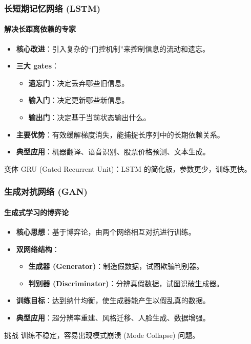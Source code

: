 \documentclass[12pt, t, aspectratio=169]{beamer}
\begin{document}
\begin{frame}
    \frametitle{长短期记忆网络 (LSTM)}
    \framesubtitle{解决长距离依赖的专家}
    
    \begin{itemize}
        \item \textbf{核心改进}：引入复杂的“门控机制”来控制信息的流动和遗忘。
        \item \textbf{三大 gates}：
        \begin{itemize}
            \item \textbf{遗忘门}：决定丢弃哪些旧信息。
            \item \textbf{输入门}：决定更新哪些新信息。
            \item \textbf{输出门}：决定基于当前状态输出什么。
        \end{itemize}
        \item \textbf{主要优势}：有效缓解梯度消失，能捕捉长序列中的长期依赖关系。
        \item \textbf{典型应用}：机器翻译、语音识别、股票价格预测、文本生成。
    \end{itemize}
    
    \begin{block}{变体}
        GRU (Gated Recurrent Unit)：LSTM 的简化版，参数更少，训练更快。
    \end{block}
\end{frame}

\begin{frame}
    \frametitle{生成对抗网络 (GAN)}
    \framesubtitle{生成式学习的博弈论}
    
    \begin{itemize}
        \item \textbf{核心思想}：基于博弈论，由两个网络相互对抗进行训练。
        \item \textbf{双网络结构}：
        \begin{itemize}
            \item \textbf{生成器 (Generator)}：制造假数据，试图欺骗判别器。
            \item \textbf{判别器 (Discriminator)}：分辨真假数据，试图识破生成器。
        \end{itemize}
        \item \textbf{训练目标}：达到纳什均衡，使生成器能产生以假乱真的数据。
        \item \textbf{典型应用}：超分辨率重建、风格迁移、人脸生成、数据增强。
    \end{itemize}
    
    \begin{alertblock}{挑战}
        训练不稳定，容易出现模式崩溃 (Mode Collapse) 问题。
    \end{alertblock}
\end{frame}
\end{document}
